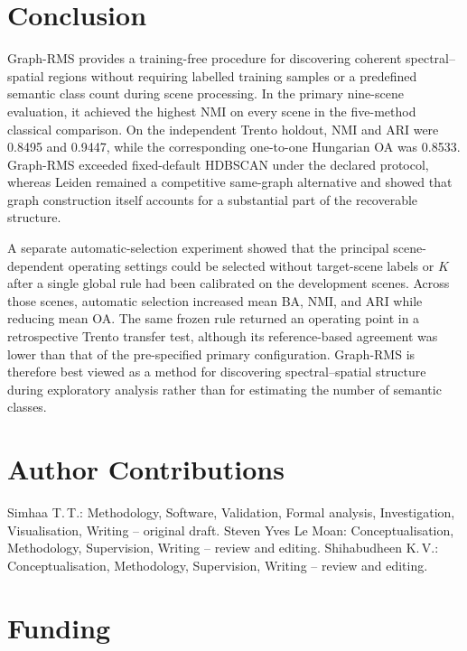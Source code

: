 \documentclass[10pt,a4paper,fleqn]{article}
\begin{document}
\section{Conclusion}
\label{sec:conclusion}

Graph-RMS provides a training-free procedure for discovering coherent
spectral--spatial regions without requiring labelled training samples or a
predefined semantic class count during scene processing. In the primary
nine-scene evaluation, it achieved the highest NMI on every scene in the
five-method classical comparison. On the independent Trento holdout, NMI and
ARI were 0.8495 and 0.9447, while the corresponding one-to-one Hungarian OA
was 0.8533. Graph-RMS exceeded fixed-default HDBSCAN under the declared
protocol, whereas Leiden remained a competitive same-graph alternative and
showed that graph construction itself accounts for a substantial part of the
recoverable structure.

A separate automatic-selection experiment showed that the principal
scene-dependent operating settings could be selected without target-scene
labels or \(K\) after a single global rule had been calibrated on the
development scenes. Across those scenes, automatic selection increased mean
BA, NMI, and ARI while reducing mean OA. The same frozen rule returned an
operating point in a retrospective Trento transfer test, although its
reference-based agreement was lower than that of the pre-specified primary
configuration. Graph-RMS is therefore best viewed as a method for discovering
spectral--spatial structure during exploratory analysis rather than for
estimating the number of semantic classes.


\section*{Author Contributions}

Simhaa T.\,T.: Methodology, Software, Validation, Formal analysis,
Investigation, Visualisation, Writing -- original draft.
Steven Yves Le Moan: Conceptualisation, Methodology, Supervision,
Writing -- review and editing.
Shihabudheen K.\,V.: Conceptualisation, Methodology, Supervision,
Writing -- review and editing.
\section*{Funding}
\end{document}
